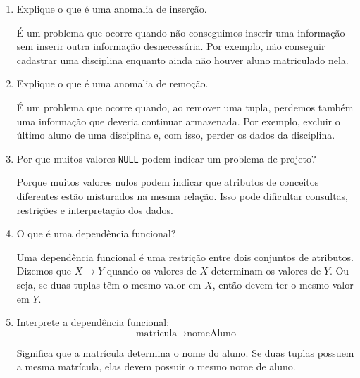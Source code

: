 \documentclass[12pt,a4paper]{article}
\begin{document}
\begin{enumerate}[label=\textbf{Q\arabic*.}]
\begin{resposta}
É um problema que ocorre quando uma informação repetida precisa ser alterada em vários lugares. Se a alteração for feita apenas em algumas tuplas, o banco fica inconsistente.
\end{resposta}

\item Explique o que é uma anomalia de inserção.

\begin{resposta}
É um problema que ocorre quando não conseguimos inserir uma informação sem inserir outra informação desnecessária. Por exemplo, não conseguir cadastrar uma disciplina enquanto ainda não houver aluno matriculado nela.
\end{resposta}

\item Explique o que é uma anomalia de remoção.

\begin{resposta}
É um problema que ocorre quando, ao remover uma tupla, perdemos também uma informação que deveria continuar armazenada. Por exemplo, excluir o último aluno de uma disciplina e, com isso, perder os dados da disciplina.
\end{resposta}

\item Por que muitos valores \texttt{NULL} podem indicar um problema de projeto?

\begin{resposta}
Porque muitos valores nulos podem indicar que atributos de conceitos diferentes estão misturados na mesma relação. Isso pode dificultar consultas, restrições e interpretação dos dados.
\end{resposta}

\item O que é uma dependência funcional?

\begin{resposta}
Uma dependência funcional é uma restrição entre dois conjuntos de atributos. Dizemos que $X \rightarrow Y$ quando os valores de $X$ determinam os valores de $Y$. Ou seja, se duas tuplas têm o mesmo valor em $X$, então devem ter o mesmo valor em $Y$.
\end{resposta}

\item Interprete a dependência funcional:
\[
\text{matricula} \rightarrow \text{nomeAluno}
\]

\begin{resposta}
Significa que a matrícula determina o nome do aluno. Se duas tuplas possuem a mesma matrícula, elas devem possuir o mesmo nome de aluno.
\end{resposta}

\end{enumerate}
\end{document}
